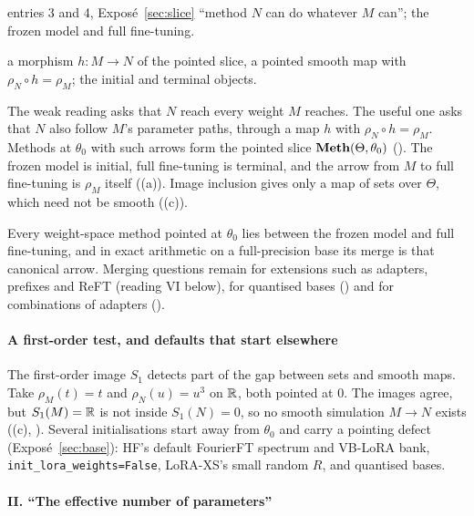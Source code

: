 \begin{example*}{entries 3 and 4, Exposé~\ref{sec:slice}}
\enspace ``method $N$ can do whatever $M$ can''; the frozen model and full fine-tuning.\par
\noindent{}\enspace a morphism $h:M\to N$ of the pointed slice, a
pointed smooth map with $\rho_N\circ h=\rho_M$; the initial and terminal objects.
\end{example*}

The weak reading asks that $N$ reach every weight $M$ reaches. The useful one asks that $N$ also follow $M$'s parameter
paths, through a map $h$ with $\rho_N\circ h=\rho_M$. Methods at $\theta_0$ with such arrows form the pointed slice
$\mathbf{Meth}(\Theta,\theta_0)$ (). The frozen model is initial, full fine-tuning is terminal, and the
arrow from $M$ to full fine-tuning is $\rho_M$ itself ((a)). Image inclusion gives only a map of
sets over $\Theta$, which need not be smooth ((c)).

\begin{explains}
Every weight-space method pointed at $\theta_0$ lies between the frozen model and full fine-tuning, and in exact
arithmetic on a full-precision base its merge is that canonical arrow. Merging questions remain for extensions such as
adapters, prefixes and ReFT (reading VI below), for quantised bases () and for combinations of
adapters ().
\end{explains}

\paragraph{A first-order test, and defaults that start elsewhere}
The first-order image $S_1$ detects part of the gap between sets and smooth maps. Take $\rho_M(t)=t$ and
$\rho_N(u)=u^3$ on $\mathbb{R}$, both pointed at $0$. The images agree, but $S_1(M)=\mathbb{R}$ is not inside $S_1(N)=0$, so no smooth
simulation $M\to N$ exists ((c), ). Several initialisations start
away from $\theta_0$ and carry a pointing defect (Exposé~\ref{sec:base}): HF's default FourierFT spectrum and VB-LoRA
bank, \texttt{init\_lora\_weights=False}, LoRA-XS's small random $R$, and quantised bases.

\paragraph{II. ``The effective number of parameters''}

